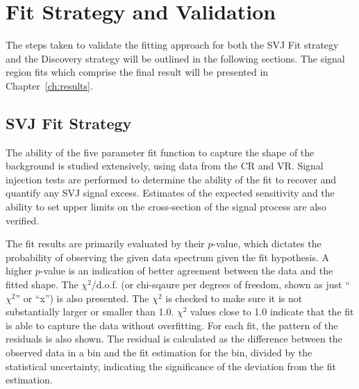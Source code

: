 \section{Fit Strategy and Validation}
\label{sec:fit_strategy}

The steps taken to validate the fitting approach for both the SVJ Fit strategy and the Discovery strategy will be outlined in the following sections. The signal region fits which comprise the final result will be presented in Chapter~\ref{ch:results}.

\subsection{SVJ Fit Strategy}
\label{subsec:fit_exclusion}

The ability of the five parameter fit function to capture the shape of the background is studied extensively, using data from the CR and VR. Signal injection tests are performed to determine the ability of the fit to recover and quantify any SVJ signal excess. Estimates of the expected sensitivity and the ability to set upper limits on the cross-section of the signal process are also verified.\par

The fit results are primarily evaluated by their $p$-value, which dictates the probability of observing the given data spectrum given the fit hypothesis.
A higher $p$-value is an indication of better agreement between the data and the fitted shape. 
The $\chi^2$/d.o.f. (or chi-sqaure per degrees of freedom, shown as just ``$\chi^2$'' or ``x'') is also presented.
The $\chi^2$ is checked to make sure it is not substantially larger or smaller than 1.0. 
$\chi^2$ values close to 1.0 indicate that the fit is able to capture the data without overfitting.
For each fit, the pattern of the residuals is also shown.
The residual is calculated as the difference between the observed data in a bin and the fit estimation for the bin, divided by the statistical uncertainty, indicating the significance of the deviation from the fit estimation.

